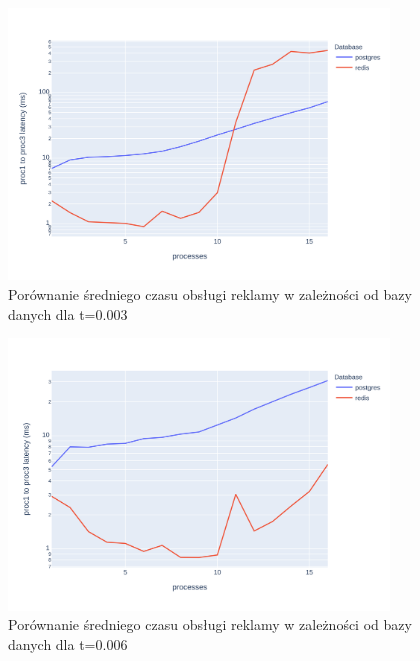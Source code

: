 \documentclass[10pt]{article}
\begin{document}
\begin{figure}[H]
    \centering
    \includegraphics[width=0.9\textwidth]{./graphs/diff_in_end_postgres_vs_redis0003.png}
    \caption{Porównanie średniego czasu obsługi reklamy w zależności od bazy danych dla t=0.003}
\end{figure}

\begin{figure}[H]
    \centering
    \includegraphics[width=0.9\textwidth]{./graphs/diff_in_end_postgres_vs_redis0006.png}
    \caption{Porównanie średniego czasu obsługi reklamy w zależności od bazy danych dla t=0.006}
\end{figure}
\end{document}
